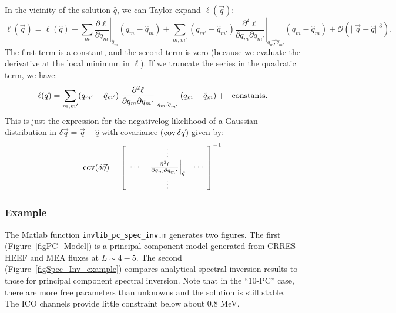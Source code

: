 \documentclass{article}    %
\newcommand{\cov}{\mathop{{\rm cov}}}
\begin{document}
In the vicinity of the solution $\hat{q}$, we can Taylor expand $\ell(\vec{q})$:
\begin{equation}
\ell(\vec{q}) = \ell(\hat{q}) + 
\sum_m \left.\frac{\partial \ell}{\partial q_m}\right|_{\hat{q}_m}(q_m-\hat{q}_m) + 
\sum_{m,m'} (q_{m'}-\hat{q}_{m'})\left.\frac{\partial^2 \ell}{\partial q_m \partial q_{m'}}\right|_{\hat{q_m,q_{m'}}}(q_m-\hat{q}_m) + \mathcal{O}(||\vec{q}-\hat{q}||^3).
\end{equation}
The first term is a constant, and the second term is zero (because we evaluate the derivative at the local minimum in $\ell$). If we truncate
the series in the quadratic term, we have:
\begin{equation}
\ell(\vec{q}) = \sum_{m,m'} (q_{m'}-\hat{q}_{m'})\left.\frac{\partial^2 \ell}{\partial q_m \partial q_{m'}}\right|_{\hat{q_m,q_{m'}}}(q_m-\hat{q}_m) + {\rm ~~ constants}.
\end{equation}
This is just the expression for the negativelog likelihood of a
Gaussian distribution in $\delta\vec{q} = \vec{q}-\hat{q}$ with
covariance ($\cov{\delta\vec{q}}$) given by:
\begin{equation}
\cov(\delta\vec{q}) = \left[
\begin{array}{ccc}
~ & \vdots & ~ \\
\cdots & \left.
\frac{\partial^2 \ell}{\partial q_m \partial q_{m'}}
\right|_{\hat{q}}
& \cdots \\
~ & \vdots & ~ 
\end{array}
\right]^{-1}
\end{equation}

\subsubsection{Example}

The Matlab function \verb|invlib_pc_spec_inv.m| generates two
figures. The first (Figure~\ref{figPC_Model}) is a principal component
model generated from CRRES HEEF and MEA fluxes at $L \sim 4-5$. The
second (Figure~\ref{figSpec_Inv_example}) compares analytical spectral
inversion results to those for principal component spectral
inversion. Note that in the ``10-PC'' case, there are more free
parameters than unknowns and the solution is still stable. The ICO
channels provide little constraint below about 0.8 MeV.
\end{document}
